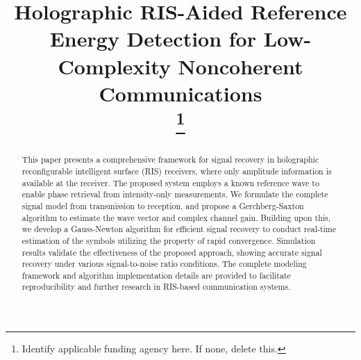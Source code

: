 \documentclass[journal]{IEEEtran}
\begin{document}
\title{Holographic RIS-Aided Reference Energy Detection for Low-Complexity Noncoherent Communications\\
\thanks{Identify applicable funding agency here. If none, delete this.}
}

\author{
\and
{}
\and
{}
}


\maketitle

\begin{abstract}
This paper presents a comprehensive framework for signal recovery in holographic reconfigurable intelligent surface (RIS) receivers, where only amplitude information is available at the receiver. The proposed system employs a known reference wave to enable phase retrieval from intensity-only measurements. We formulate the complete signal model from transmission to reception, and propose a Gerchberg-Saxton algorithm to estimate the wave vector and complex channel gain. Building upon this, we develop a Gauss-Newton algorithm for efficient signal recovery to conduct real-time estimation of the symbols utilizing the property of rapid convergence. Simulation results validate the effectiveness of the proposed approach, showing accurate signal recovery under various signal-to-noise ratio conditions. The complete modeling framework and algorithm implementation details are provided to facilitate reproducibility and further research in RIS-based communication systems.
\end{abstract}
\end{document}
